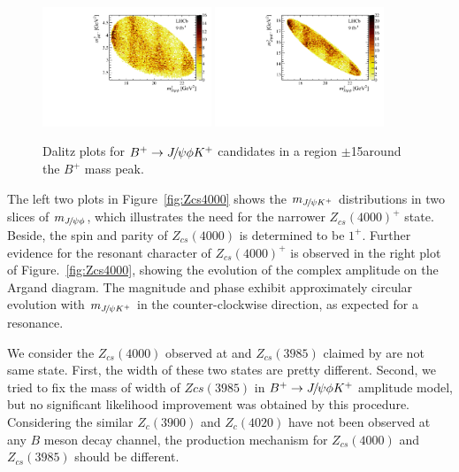 \begin{figure}[!hbtp]
\centering
   \includegraphics[width=0.45\textwidth]{Figures/01_Introduction/Exotic/Zcs/mphik2_mjpsiphi2} %
   \includegraphics[width=0.45\textwidth]{Figures/01_Introduction/Exotic/Zcs/mjpsik2_mjpsiphi2} %
   \caption{ 
   Dalitz plots for ${{B}^+}\rightarrow{\ensuremath{{J\mskip -3mu/\mskip -2mu\psi}}}\phi{\ensuremath{{K}^+}}$ candidates in a region $\pm$15\mev around the $B^+$ mass peak.}
\label{fig:Zcs4000_dalitz}
\end{figure}

The left two plots in Figure~\ref{fig:Zcs4000} shows the $m_{{{J\mskip -3mu/\mskip -2mu\psi}}{{K}^+}}$ distributions in two slices of $m_{{{J\mskip -3mu/\mskip -2mu\psi}}\phi}$,
which illustrates the need for the narrower $Z_{cs}(4000)^+$ state. 
Beside,
the spin and parity of $Z_{cs}(4000)$ is determined to be $1^{+}$. 
Further evidence for the resonant character of $Z_{cs}(4000)^+$ is observed in the right plot of Figure.~\ref{fig:Zcs4000}, 
showing the evolution of the complex amplitude on the Argand diagram.
The magnitude and phase exhibit approximately circular evolution with $m_{{{J\mskip -3mu/\mskip -2mu\psi}}{{K}^+}}$ in the counter-clockwise direction,
as expected for a resonance.

We consider the $Z_{cs}(4000)$ observed at \lhcb and $Z_{cs}(3985)$ claimed by \besiii are not same state.
First, 
the width of these two states are pretty different.
Second,
we tried to fix the mass of width of $Zcs(3985)$ in ${{{B}^+}}\rightarrow{\ensuremath{{J\mskip -3mu/\mskip -2mu\psi}}}\phi{\ensuremath{{K}^+}}$ amplitude model,
but no significant likelihood improvement was obtained by this procedure. 
Considering the similar $Z_{c}(3900)$ and $Z_{c}(4020)$ have not been observed at any $B$ meson decay channel,
the production mechanism for $Z_{cs}(4000)$ and $Z_{cs}(3985)$ should be different.


